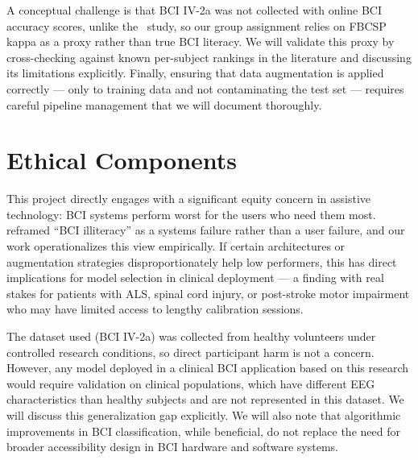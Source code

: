 \documentclass{article}
\begin{document}
A conceptual challenge is that BCI IV-2a was not collected with online BCI accuracy scores, unlike the~\cite{nakanishi2022classification} study, so our group assignment relies on FBCSP kappa as a proxy rather than true BCI literacy. We will validate this proxy by cross-checking against known per-subject rankings in the literature and discussing its limitations explicitly. Finally, ensuring that data augmentation is applied correctly --- only to training data and not contaminating the test set --- requires careful pipeline management that we will document thoroughly.

\section{Ethical Components}

This project directly engages with a significant equity concern in assistive technology: BCI systems perform worst for the users who need them most. \cite{blankertz2009bci} reframed ``BCI illiteracy'' as a systems failure rather than a user failure, and our work operationalizes this view empirically. If certain architectures or augmentation strategies disproportionately help low performers, this has direct implications for model selection in clinical deployment --- a finding with real stakes for patients with ALS, spinal cord injury, or post-stroke motor impairment who may have limited access to lengthy calibration sessions.

The dataset used (BCI IV-2a) was collected from healthy volunteers under controlled research conditions, so direct participant harm is not a concern. However, any model deployed in a clinical BCI application based on this research would require validation on clinical populations, which have different EEG characteristics than healthy subjects and are not represented in this dataset. We will discuss this generalization gap explicitly. We will also note that algorithmic improvements in BCI classification, while beneficial, do not replace the need for broader accessibility design in BCI hardware and software systems.



\end{document}

